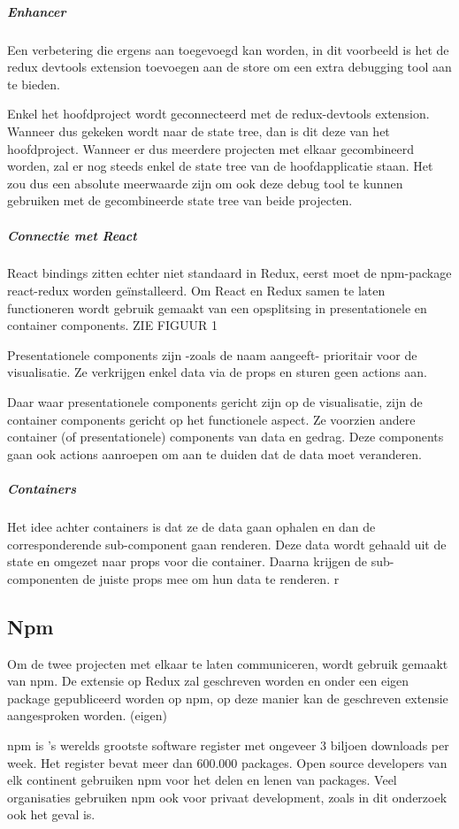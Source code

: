 \subparagraph{Enhancer}
Een verbetering die ergens aan toegevoegd kan worden, in dit voorbeeld is het de redux devtools extension toevoegen aan de store om een extra debugging tool aan te bieden.

Enkel het hoofdproject wordt geconnecteerd met de redux-devtools extension. Wanneer dus gekeken wordt naar de state tree, dan is dit deze van het hoofdproject. Wanneer er dus meerdere projecten met elkaar gecombineerd worden, zal er nog steeds enkel de state tree van de hoofdapplicatie staan. Het zou dus een absolute meerwaarde zijn om ook deze debug tool te kunnen gebruiken met de gecombineerde state tree van beide projecten.

\subparagraph{Connectie met React}
React bindings zitten echter niet standaard in Redux, eerst moet de npm-package react-redux worden geïnstalleerd. Om React en Redux samen te laten functioneren wordt gebruik gemaakt van een opsplitsing in presentationele en container components. 
ZIE FIGUUR 1

Presentationele components zijn -zoals de naam aangeeft- prioritair voor de visualisatie. Ze verkrijgen enkel data via de props en sturen geen actions aan. 

Daar waar presentationele components gericht zijn op de visualisatie, zijn de container components gericht op het functionele aspect. Ze voorzien andere container (of presentationele) components van data en gedrag. Deze components gaan ook actions aanroepen om aan te duiden dat de data moet veranderen.  


\subparagraph{Containers}
Het idee achter containers is dat ze de data gaan ophalen en dan de corresponderende sub-component gaan renderen. Deze data wordt gehaald uit de state en omgezet naar props voor die container. Daarna krijgen de sub-componenten de juiste props mee om hun data te renderen. r



\subsection{Npm}
Om de twee projecten met elkaar te laten communiceren, wordt gebruik gemaakt van npm. De extensie op Redux zal geschreven worden en onder een eigen package gepubliceerd worden op npm, op deze manier kan de geschreven extensie aangesproken worden. 
(eigen)


npm is 's werelds grootste software register met ongeveer 3 biljoen downloads per week. Het register bevat meer dan 600.000 packages. Open source developers van elk continent gebruiken npm voor het delen en lenen van packages. Veel organisaties gebruiken npm ook voor privaat development, zoals in dit onderzoek ook het geval is. 


